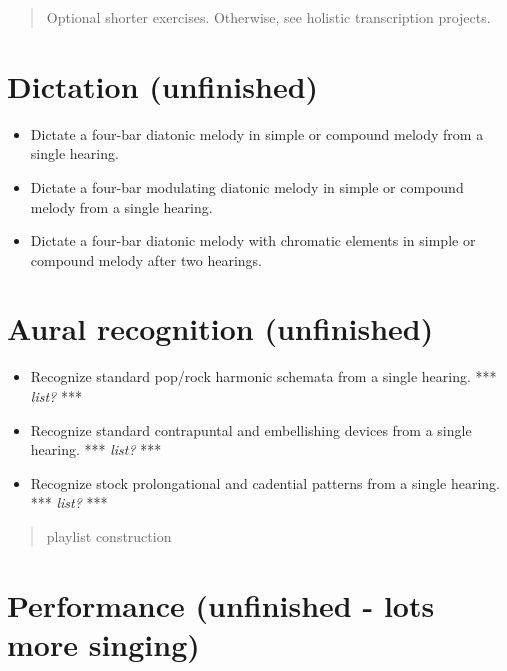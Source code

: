 \begin{quote}

Optional shorter exercises. Otherwise, see holistic transcription projects.
\end{quote}

\section{Dictation (unfinished)}
\label{dictationunfinished}

\begin{itemize}
\item Dictate a four-bar diatonic melody in simple or compound melody from a single hearing.

\item Dictate a four-bar modulating diatonic melody in simple or compound melody from a single hearing.

\item Dictate a four-bar diatonic melody with chromatic elements in simple or compound melody after two hearings.

\end{itemize}

\section{Aural recognition (unfinished)}
\label{auralrecognitionunfinished}

\begin{itemize}
\item Recognize standard pop\slash rock harmonic schemata from a single hearing. *** \emph{list?} ***

\item Recognize standard contrapuntal and embellishing devices from a single hearing. *** \emph{list?} ***

\item Recognize stock prolongational and cadential patterns from a single hearing. *** \emph{list?} ***

\end{itemize}

\begin{quote}

playlist construction
\end{quote}

\section{Performance (unfinished - lots more singing)}
\label{performanceunfinished-lotsmoresinging}

